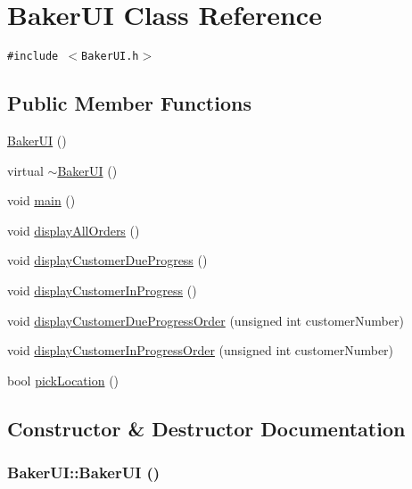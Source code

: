 \hypertarget{class_baker_u_i}{
\section{Baker\-UI Class Reference}
\label{class_baker_u_i}
}
{\tt \#include $<$Baker\-UI.h$>$}

\subsection*{Public Member Functions}
\begin{CompactItemize}
\item 
\hyperlink{class_baker_u_i_87258ad33e2a7d3de72a762f438be622}{Baker\-UI} ()
\item 
virtual \hyperlink{class_baker_u_i_915b879a3aa8be3782d3a24fd36fb81d}{$\sim$Baker\-UI} ()
\item 
void \hyperlink{class_baker_u_i_ea83b916b3f52eec32ae6d54d59b4453}{main} ()
\item 
void \hyperlink{class_baker_u_i_d69822b9289cd53fa4da8f4f39864d19}{display\-All\-Orders} ()
\item 
void \hyperlink{class_baker_u_i_00eeac47a993278134a2d8ba936f6f31}{display\-Customer\-Due\-Progress} ()
\item 
void \hyperlink{class_baker_u_i_49612691d8a1c466378d3e4507aff847}{display\-Customer\-In\-Progress} ()
\item 
void \hyperlink{class_baker_u_i_9afa245c6153335e553d88f8e7ad2c2e}{display\-Customer\-Due\-Progress\-Order} (unsigned int customer\-Number)
\item 
void \hyperlink{class_baker_u_i_12edcb5c93a8a60d06b8c9de906c4be0}{display\-Customer\-In\-Progress\-Order} (unsigned int customer\-Number)
\item 
bool \hyperlink{class_baker_u_i_74d0d6b7d7493e8a9703bc8fbeb79f2e}{pick\-Location} ()
\end{CompactItemize}


\subsection{Constructor \& Destructor Documentation}
\hypertarget{class_baker_u_i_87258ad33e2a7d3de72a762f438be622}{
\subsubsection[BakerUI]{\setlength{\rightskip}{0pt plus 5cm}Baker\-UI::Baker\-UI ()}}
\label{class_baker_u_i_87258ad33e2a7d3de72a762f438be622}


